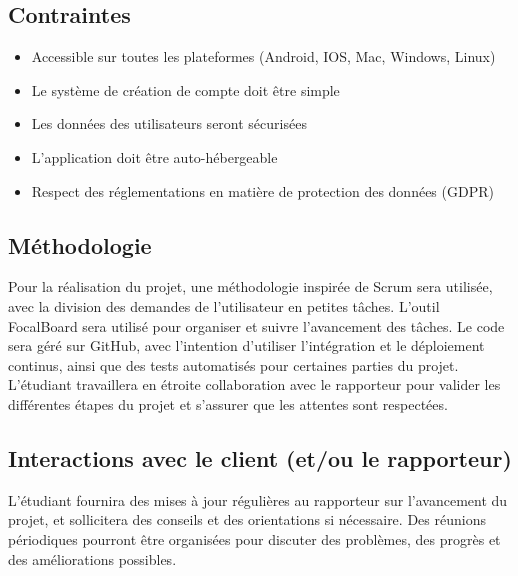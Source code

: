 \subsection{Contraintes}\label{subsec:contraintes}
\begin{itemize}
    \item Accessible sur toutes les plateformes (Android, IOS, Mac, Windows, Linux)
    \item Le système de création de compte doit être simple
    \item Les données des utilisateurs seront sécurisées
    \item L’application doit être auto-hébergeable
    \item Respect des réglementations en matière de protection des données (GDPR)
\end{itemize}

\subsection{Méthodologie}\label{subsec:methodologie}
Pour la réalisation du projet, une méthodologie inspirée de Scrum sera utilisée, avec la division des demandes de l'utilisateur en petites tâches.
L'outil FocalBoard sera utilisé pour organiser et suivre l'avancement des tâches.
Le code sera géré sur GitHub, avec l'intention d'utiliser l'intégration et le déploiement continus, ainsi que des tests automatisés pour certaines parties du projet.
L'étudiant travaillera en étroite collaboration avec le rapporteur pour valider les différentes étapes du projet et s'assurer que les attentes sont respectées.

\subsection{Interactions avec le client (et/ou le rapporteur)}\label{subsec:interactions-avec-le-client-(et/ou-le-rapporteur)}
L'étudiant fournira des mises à jour régulières au rapporteur sur l'avancement du projet, et sollicitera des conseils et des orientations si nécessaire.
Des réunions périodiques pourront être organisées pour discuter des problèmes, des progrès et des améliorations possibles.